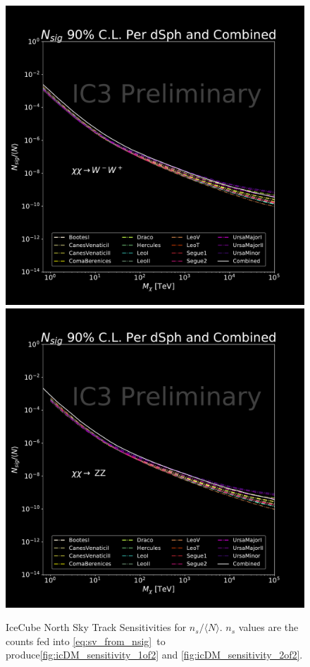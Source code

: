\begin{figure}[h!]
{        \includegraphics[scale=0.24]{figures/ic_DM/dm_plots/WW_money_plot_comb_ns.pdf}
        \includegraphics[scale=0.24]{figures/ic_DM/dm_plots/ZZ_money_plot_comb_ns.pdf}
    }
    \caption{IceCube North Sky Track Sensitivities for $n_s / \langle N \rangle$. $n_s$ values are the counts fed into \cref{eq:sv_from_nsig}~to produce\cref{fig:icDM_sensitivity_1of2} and \cref{fig:icDM_sensitivity_2of2}.}
    \label{fig:icDM_NSsensitivity_1of2}
\end{figure}

